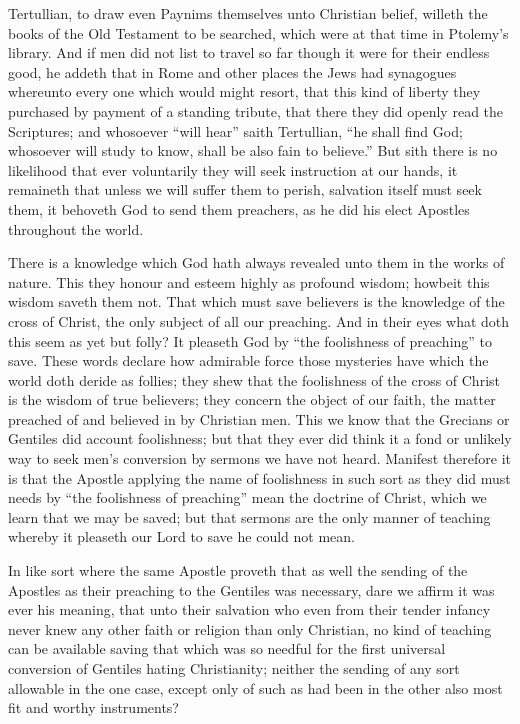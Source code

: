 Tertullian, to draw even Paynims themselves unto Christian belief, willeth the books of the Old Testament to be searched, which were at that time in Ptolemy’s library. And if men did not list to travel so far though it were for their endless good, he addeth that in Rome and other places the Jews had synagogues whereunto every one which would might resort, that this kind of liberty they purchased by payment of a standing tribute, that there they did openly read the Scriptures; and whosoever “will hear” saith Tertullian, “he shall find God; whosoever will study to  know, shall be also fain to believe.” But sith there is no likelihood that ever voluntarily they will seek instruction at our hands, it remaineth that unless we will suffer them to perish, salvation itself must seek them, it behoveth God to send them preachers, as he did his elect Apostles throughout the world.

There is a knowledge which God hath always revealed unto them in the works of nature. This they honour and esteem highly as profound wisdom; howbeit this wisdom saveth them not. That which must save believers is the knowledge of the cross of Christ, the only subject of all our preaching. And in their eyes what doth this seem as yet but folly? It pleaseth God by “the foolishness of preaching” to save. These words declare how admirable force those mysteries have which the world doth deride as follies; they shew that the foolishness of the cross of Christ is the wisdom of true believers; they concern the object of our faith, the matter preached of and believed in by Christian men. This we know that the Grecians or Gentiles did account foolishness; but that they ever did think it a fond or unlikely way to seek men’s conversion by sermons we have not heard. Manifest therefore it is that the Apostle applying the name of foolishness in such sort as they did must needs by “the foolishness of preaching” mean the doctrine of Christ, which we learn that we may be saved; but that sermons are the only manner of teaching whereby it pleaseth our Lord to save he could not mean.

In like sort where the same Apostle proveth that as well the sending of the Apostles as their preaching to the Gentiles was necessary, dare we affirm it was ever his meaning, that unto their salvation who even from their tender infancy never knew any other faith or religion than only Christian, no kind of teaching can be available saving that which was so needful for the first universal conversion of Gentiles hating Christianity; neither the sending of any sort allowable in the one case, except only of such as had been in the other also most fit and worthy instruments?

